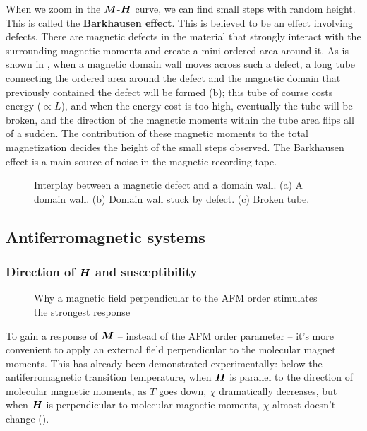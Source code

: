 \documentclass[hyperref, a4paper]{article}
\newcommand*{\concept}[1]{{\textbf{#1}}}
\begin{document}
When we zoom in the $\vb*{M}$-$\vb*{H}$ curve, 
we can find small steps with random height.
This is called the \concept{Barkhausen effect}.
This is believed to be an effect involving defects.
There are magnetic defects in the material that strongly interact with the surrounding magnetic moments 
and create a mini ordered area around it. 
As is shown in , 
when a magnetic domain wall moves across such a defect, 
a long tube connecting the ordered area around the defect 
and the magnetic domain that previously contained the defect will be formed (b);
this tube of course costs energy ($\propto L$), 
and when the energy cost is too high, 
eventually the tube will be broken, 
and the direction of the magnetic moments within the tube area 
flips all of a sudden. 
The contribution of these magnetic moments to the total magnetization 
decides the height of the small steps observed.
The Barkhausen effect is a main source of noise in the magnetic recording tape.

\begin{figure}
    \centering
    
    \caption{Interplay between a magnetic defect and a domain wall. 
    (a) A domain wall.
    (b) Domain wall stuck by defect.
    (c) Broken tube.}
    \label{fig:magnetic-defect-domain-wall-interplay}
\end{figure}

\subsection{Antiferromagnetic systems}

\subsubsection{Direction of $\vb*{H}$ and susceptibility}

\begin{figure}
    \centering
    
    \caption{Why a magnetic field perpendicular to the AFM order stimulates the strongest response}
    \label{fig:afm-response}
\end{figure}

To gain a response of $\vb*{M}$ -- instead of the AFM order parameter -- 
it's more convenient to apply an external field 
perpendicular to the molecular magnet moments. 
This has already been demonstrated experimentally:
below the antiferromagnetic transition temperature,
when $\vb*{H}$ is parallel to the direction of molecular magnetic moments,
as $T$ goes down, $\chi$ dramatically decreases, 
but when $\vb*{H}$ is perpendicular to molecular magnetic moments, 
$\chi$ almost doesn't change
(). 
\end{document}
